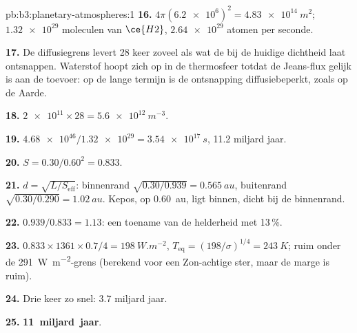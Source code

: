 \begin{solution}{pb:b3:planetary-atmospheres:1}
\textbf{16.} $4\pi(\num{6.2e6})^2 = \qty{4.83e14}{m^2}$; $\num{1.32e29}$ moleculen
van $\ce{H2}$, $\num{2.64e29}$ atomen per seconde.

\textbf{17.} De diffusiegrens levert 28 keer zoveel als wat de  bij de huidige
dichtheid laat ontsnappen. Waterstof hoopt zich op in de thermosfeer totdat de
Jeans-flux gelijk is aan de toevoer: op de lange termijn is de ontsnapping
diffusiebeperkt, zoals op de Aarde.

\textbf{18.} $\num{2e11}\times28 = \qty{5.6e12}{m^{-3}}$.

\textbf{19.} $\num{4.68e46}/\num{1.32e29} = \qty{3.54e17}{s}$, 11.2 miljard jaar.

\textbf{20.} $S = 0.30/0.60^2 = 0.833$.

\textbf{21.} $d = \sqrt{L/S_\mathrm{eff}}$: binnenrand $\sqrt{0.30/0.939} =
\qty{0.565}{au}$, buitenrand $\sqrt{0.30/0.290} = \qty{1.02}{au}$. Kepos,
op \qty{0.60}{au}, ligt binnen, dicht bij de binnenrand.

\textbf{22.} $0.939/0.833 = 1.13$: een toename van de helderheid met 13\,\%.

\textbf{23.} $0.833\times1361\times0.7/4 = \qty{198}{W.m^{-2}}$, $T_\mathrm{eq} =
(198/\sigma)^{1/4} = \qty{243}{K}$; ruim onder de
\qty{291}{W.m^{-2}}-grens (berekend voor een Zon-achtige ster, maar de marge
is ruim).

\textbf{24.} Drie keer zo snel: 3.7 miljard jaar.

\textbf{25.} \textbf{11~miljard~jaar}.
\end{solution}
